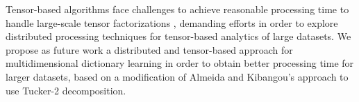 Tensor-based algorithms face challenges to achieve reasonable processing time to handle large-scale tensor factorizations \cite{de2014distributed}, demanding efforts in order to explore distributed processing techniques for tensor-based analytics of large datasets. We propose as future work a distributed and tensor-based approach for multidimensional dictionary learning in order to obtain better processing time for larger datasets, based on a modification of Almeida and Kibangou's \cite{de2014distributed} approach to use Tucker-2 decomposition.